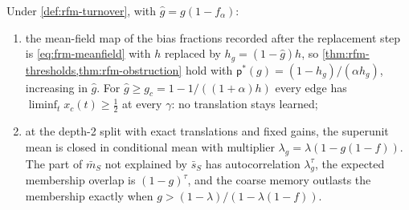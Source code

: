 \begin{proposition}\label{prop:rfm-turnover}
Under \cref{def:rfm-turnover}, with $\hat g=g(1-f_\alpha)$:
\begin{enumerate}
\item[(a)] the mean-field map of the bias fractions recorded after the replacement step is \eqref{eq:frm-meanfield} with $h$ replaced by $h_g=(1-\hat g)h$, so \cref{thm:rfm-thresholds,thm:rfm-obstruction} hold with $\mathsf p^\ast(g)=(1-h_g)/(\alpha h_g)$, increasing in $\hat g$. For $\hat g\ge g_c=1-1/((1+\alpha)h)$ every edge has $\liminf_tx_c(t)\ge\frac12$ at every $\gamma$: no translation stays learned;
\item[(b)] at the depth-2 split with exact translations and fixed gains, the superunit mean is closed in conditional mean with multiplier $\lambda_g=\lambda(1-g(1-f))$. The part of $\bar m_S$ not explained by $\bar s_S$ has autocorrelation $\lambda_g^\tau$, the expected membership overlap is $(1-g)^\tau$, and the coarse memory outlasts the membership exactly when $g>(1-\lambda)/(1-\lambda(1-f))$.
\end{enumerate}
\end{proposition}

